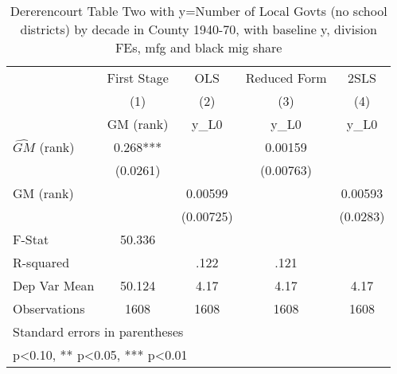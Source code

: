 \begin{table}[htbp]\centering
\def\sym#1{\ifmmode^{#1}\else\(^{#1}\)\fi}
\caption{Dererencourt Table Two with y=Number of Local Govts (no school districts) by decade in County 1940-70, with baseline y, division FEs, mfg and black mig share}
\begin{tabular}{l*{4}{c}}
\toprule
                    & First Stage   &         OLS   &Reduced Form   &        2SLS   \\
                    &\multicolumn{1}{c}{(1)}&\multicolumn{1}{c}{(2)}&\multicolumn{1}{c}{(3)}&\multicolumn{1}{c}{(4)}\\
                    &\multicolumn{1}{c}{GM  (rank)}&\multicolumn{1}{c}{y\_L0}&\multicolumn{1}{c}{y\_L0}&\multicolumn{1}{c}{y\_L0}\\
\midrule
$\hat{GM}$ (rank)   &       0.268***&               &     0.00159   &               \\
                    &    (0.0261)   &               &   (0.00763)   &               \\
\addlinespace
GM  (rank)          &               &     0.00599   &               &     0.00593   \\
                    &               &   (0.00725)   &               &    (0.0283)   \\
\midrule
F-Stat              &      50.336   &               &               &               \\
R-squared           &               &        .122   &        .121   &               \\
Dep Var Mean        &      50.124   &        4.17   &        4.17   &        4.17   \\
Observations        &        1608   &        1608   &        1608   &        1608   \\
\bottomrule
\multicolumn{5}{l}{\footnotesize Standard errors in parentheses}\\
\multicolumn{5}{l}{\footnotesize * p<0.10, ** p<0.05, *** p<0.01}\\
\end{tabular}
\end{table}
